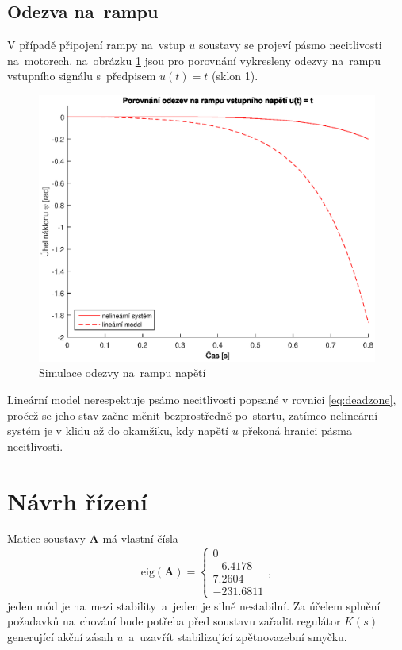 \documentclass[conference]{IEEEtran}
\begin{document}
\subsection{Odezva na~rampu}
V případě připojení rampy na~vstup $u$ soustavy se projeví pásmo necitlivosti na~motorech. na~obrázku \ref{fig:porovnani_rampa} jsou pro porovnání
vykresleny odezvy na~rampu vstupního signálu s~předpisem $u(t) = t$ (sklon 1). 
\begin{figure}[htbp]
    \centerline{\includegraphics[width=\linewidth]{porovnani_rampa.eps}}
    \caption{Simulace odezvy na~rampu napětí}
    \label{fig:porovnani_rampa}        
\end{figure}
Lineární model nerespektuje psámo necitlivosti popsané v rovnici \eqref{eq:deadzone}, pročež se jeho stav začne měnit bezprostředně po~startu,
zatímco nelineární systém je v klidu až do okamžiku, kdy napětí $u$ překoná hranici pásma necitlivosti.

\section{Návrh řízení}
Matice soustavy $\textbf{A}$ má vlastní čísla 
\begin{equation}
	\text{eig}(\mathbf{A}) =
	\begin{cases}
        0 \\
        -6.4178 \\
        7.2604 \\
        -231.6811
    \end{cases},
    \label{eq:unstable_poles}
\end{equation}
jeden mód je na~mezi stability~a~jeden je silně nestabilní. Za účelem splnění požadavků na~chování bude potřeba před soustavu zařadit regulátor $K(s)$ generující
akční zásah $u$~a~uzavřít stabilizující zpětnovazební smyčku.
\end{document}
